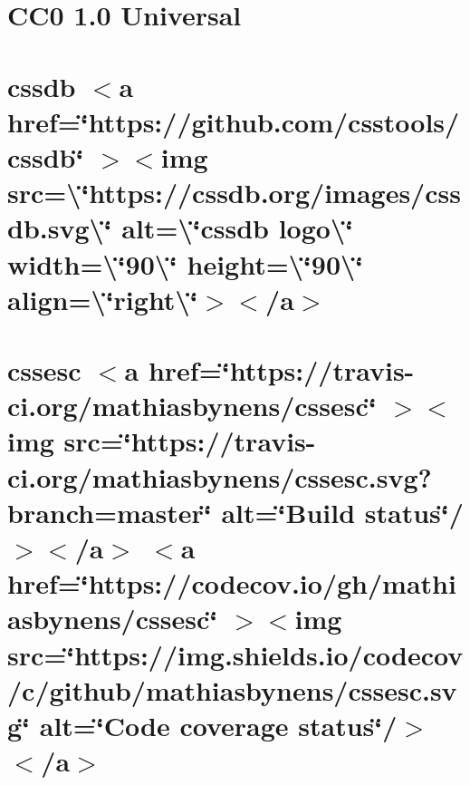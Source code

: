 \documentclass[twoside]{book}
\newcommand{\+}{\discretionary{\mbox{\scriptsize$\hookleftarrow$}}{}{}}
\begin{document}
\chapter{CC0 1.0 Universal}
\label{md__c___users_vaishnavi_jadhav__desktop__developer_code_mean_stack_example_client_node_modules_cssdb__l_i_c_e_n_s_e}

\chapter{cssdb \texorpdfstring{$<$}{<}a href=\char`\"{}https\+://github.\+com/csstools/cssdb\char`\"{} \texorpdfstring{$>$}{>}\texorpdfstring{$<$}{<}img src=\textbackslash{}\char`\"{}https\+://cssdb.\+org/images/cssdb.\+svg\textbackslash{}\char`\"{} alt=\textbackslash{}\char`\"{}cssdb logo\textbackslash{}\char`\"{} width=\textbackslash{}\char`\"{}90\textbackslash{}\char`\"{} height=\textbackslash{}\char`\"{}90\textbackslash{}\char`\"{} align=\textbackslash{}\char`\"{}right\textbackslash{}\char`\"{}\texorpdfstring{$>$}{>}\texorpdfstring{$<$}{<}/a\texorpdfstring{$>$}{>}}
\label{md__c___users_vaishnavi_jadhav__desktop__developer_code_mean_stack_example_client_node_modules_cssdb__r_e_a_d_m_e}

\chapter{cssesc \texorpdfstring{$<$}{<}a href=\char`\"{}https\+://travis-\/ci.\+org/mathiasbynens/cssesc\char`\"{} \texorpdfstring{$>$}{>}\texorpdfstring{$<$}{<}img src=\char`\"{}https\+://travis-\/ci.\+org/mathiasbynens/cssesc.\+svg?branch=master\char`\"{} alt=\char`\"{}\+Build status\char`\"{}/\texorpdfstring{$>$}{>}\texorpdfstring{$<$}{<}/a\texorpdfstring{$>$}{>} \texorpdfstring{$<$}{<}a href=\char`\"{}https\+://codecov.\+io/gh/mathiasbynens/cssesc\char`\"{} \texorpdfstring{$>$}{>}\texorpdfstring{$<$}{<}img src=\char`\"{}https\+://img.\+shields.\+io/codecov/c/github/mathiasbynens/cssesc.\+svg\char`\"{} alt=\char`\"{}\+Code coverage status\char`\"{}/\texorpdfstring{$>$}{>}\texorpdfstring{$<$}{<}/a\texorpdfstring{$>$}{>}}
\label{md__c___users_vaishnavi_jadhav__desktop__developer_code_mean_stack_example_client_node_modules_cssesc__r_e_a_d_m_e}

\end{document}
